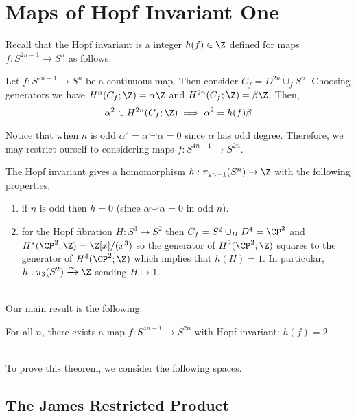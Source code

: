 \documentclass[12pt]{extarticle}
\begin{document}

\section{Maps of Hopf Invariant One}

Recall that the Hopf invariant is a integer $h(f) \in \Z$ defined for maps $f : S^{2n - 1} \to S^n$ as follows.

\begin{defn}
Let $f : S^{2n - 1} \to S^n$ be a continuous map. Then consider $C_f = D^{2n} \cup_f S^n$. Choosing generators we have $H^n(C_f ; \Z) = \alpha \Z$ and $H^{2n}(C_f; \Z) = \beta \Z$. Then,
\[ \alpha^2 \in H^{2n}(C_f ; \Z) \implies \alpha^2 = h(f) \beta \] 
\end{defn} 

\begin{rmk}
Notice that when $n$ is odd $\alpha^2 = \alpha \smile \alpha = 0$ since $\alpha$ has odd degree. Therefore, we may restrict ourself to considering maps $f : S^{4n - 1} \to S^{2n}$. 
\end{rmk}

\begin{prop}
The Hopf invariant gives a homomorphism $h : \pi_{2n - 1}(S^n) \to \Z$ with the following properties,
\begin{enumerate}
\item if $n$ is odd then $h = 0$ (since $\alpha \smile \alpha = 0$ in odd $n$).
\item for the Hopf fibration $H : S^3 \to S^2$ then $C_f = S^2 \cup_H D^4 = \CP^2$ and $H^*(\CP^2; \Z) = \Z[x]/(x^3)$ so the generator of $H^2(\CP^2; \Z)$ squares to the generator of $H^4(\CP^2; \Z)$ which implies that $h(H) = 1$. In particular, $h : \pi_3(S^2) \xrightarrow{\sim} \Z$ sending $H \mapsto 1$. 
\end{enumerate}
\end{prop}
\noindent\\
Our main result is the following.

\begin{theorem}
For all $n$, there exists a map $f : S^{4n - 1} \to S^{2n}$ with Hopf invariant: $h(f) = 2$. 
\end{theorem}
\noindent\\
To prove this theorem, we consider the following spaces.

\subsection{The James Restricted Product}
\end{document}

